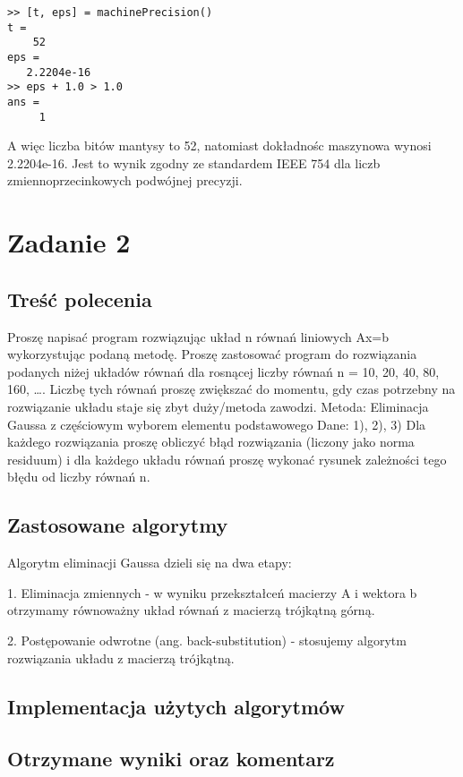 \documentclass[11pt]{article} %
\begin{document}
\begin{verbatim}
>> [t, eps] = machinePrecision()
t =
    52
eps =
   2.2204e-16
>> eps + 1.0 > 1.0
ans =
     1
\end{verbatim}
A więc liczba bitów mantysy to 52, natomiast dokładnośc maszynowa wynosi 2.2204e-16. Jest to wynik zgodny ze standardem IEEE 754 dla liczb zmiennoprzecinkowych podwójnej precyzji.

\section{Zadanie 2}

\subsection{Treść polecenia}

Proszę napisać program rozwiązując układ n równań liniowych Ax=b wykorzystując podaną metodę. Proszę zastosować program do rozwiązania podanych niżej układów równań dla rosnącej liczby równań n = 10, 20, 40, 80, 160, …. Liczbę tych równań proszę zwiększać do momentu, gdy czas potrzebny na rozwiązanie układu staje się zbyt duży/metoda zawodzi.
Metoda: Eliminacja Gaussa z częściowym wyborem elementu podstawowego
Dane:
1), 2), 3)
Dla każdego rozwiązania proszę obliczyć błąd rozwiązania (liczony jako norma residuum) i dla każdego układu równań proszę wykonać rysunek zależności tego błędu od liczby równań n.

\subsection{Zastosowane algorytmy}
Algorytm eliminacji Gaussa dzieli się na dwa etapy:

1. Eliminacja zmiennych - w wyniku przekształceń macierzy A i wektora b otrzymamy równoważny układ równań z macierzą trójkątną górną.

2. Postępowanie odwrotne (ang. back-substitution) - stosujemy algorytm rozwiązania układu z macierzą trójkątną.
\subsection{Implementacja użytych algorytmów}

\subsection{Otrzymane wyniki oraz komentarz}
\end{document}
